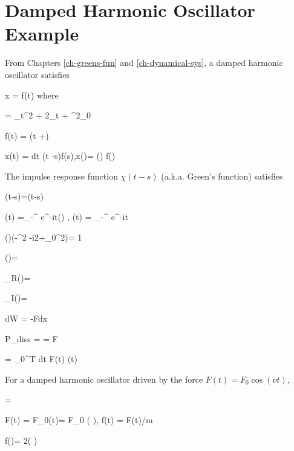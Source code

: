 \section{Damped Harmonic Oscillator Example}

From Chapters \ref{ch-greens-fun}
and \ref{ch-dynamical-sys}, a damped harmonic oscillator satisfies

\beq
\call x = f(t) 
\eeq
where

\beq
\call= \partial_t^2  + 2\gamma \partial_t + \omega^2_0
\eeq



\beq
f(t) = \cos(\omega t +\delta)
\eeq


\beq
x(t) = \int dt \chi(t -s)f(s)\;,\quad x(\omega)=
\chi(\omega) f(\omega)
\eeq

The impulse response function $\chi(t-s)$
(a.k.a. Green's function) satisfies

\beq
\call\chi(t-s)=\delta(t-s)
\eeq

\beq
\chi(t) =\int_{-\infty}^{\infty}
e^{-i\omega t}\chi(\omega)
\;,\quad
\delta(t) =
\int_{-\infty}^{\infty}
e^{-i\omega t}
\eeq

\beq
\chi(\omega)(-\omega^{2} -i2\gamma\omega  +\omega_0^2)= 1
\eeq

\beq
\chi(\omega)=
\eeq

\beq
\chi_R(\omega)=
\quad {}
\eeq

\beq
\chi_I(\omega)=
\quad {}
\eeq

\beq
dW = -Fdx
\eeq

\beq
P_{diss} =   = F 
\eeq

\beq
{}=
\int_0^T dt\; F(t) (t)
\eeq

\begin{claim}
For a damped harmonic oscillator driven by the force $F(t)=F_0\cos(\nu t)$, 

\beq
{}=
\eeq
\end{claim}
\proof
\beq
F(t) = F_0\cos(\nu t)=
 F_0 \left(
\right)\;,\;\;
f(t) = F(t)/m
\eeq

\beq
f(\omega)= 
2\pi \left(
\right)
\eeq

